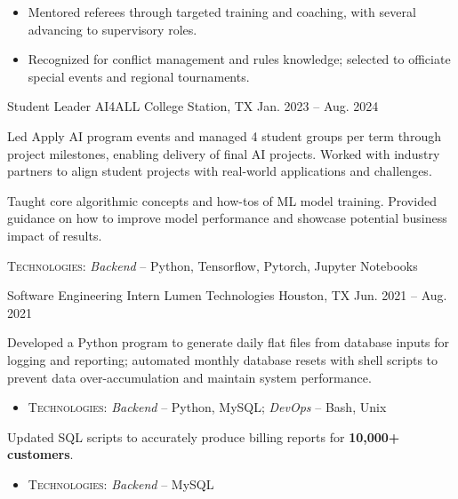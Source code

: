 \begin{cventries}
{\begin{cvitems}
{      \begin{itemize}
      \item Mentored referees through targeted training and coaching, with several advancing to supervisory roles.
      \item Recognized for conflict management and rules knowledge; selected to officiate special events and regional tournaments.
      \end{itemize}
      }
    \end{cvitems}
  }
  \cventry
  {Student Leader} %
  {AI4ALL} %
  {College Station, TX} %
  {Jan. 2023 -- Aug. 2024} %
  {
    \begin{cvitems}
      \item {Led Apply AI program events and managed 4 student groups per term through project milestones, enabling delivery of final AI projects. Worked with industry partners to align student projects with real-world applications and challenges.}
      \item {Taught core algorithmic concepts and how-tos of ML model training. Provided guidance on how to improve model performance and showcase potential business impact of results.}
      \item \textsc{Technologies}: \textit{Backend} – Python, Tensorflow, Pytorch, Jupyter Notebooks
    \end{cvitems}
  }
\cventry
    {Software Engineering Intern} %
    {Lumen Technologies} %
    {Houston, TX} %
    {Jun. 2021 -- Aug. 2021} %
    {
      \begin{cvitems}
      \item {Developed a Python program to generate daily flat files from database inputs for logging and reporting; automated monthly database resets with shell scripts to prevent data over-accumulation and maintain system performance.
      \begin{itemize}
      \item \textsc{Technologies}: \textit{Backend} – Python, MySQL; \textit{DevOps} – Bash, Unix
      \end{itemize}
      }
      \item {Updated SQL scripts to accurately produce billing reports for \textbf{10,000+ customers}.
      \begin{itemize}
      \item \textsc{Technologies}: \textit{Backend} – MySQL
      \end{itemize}
      }
      \end{cvitems}
    }
\end{cventries}

